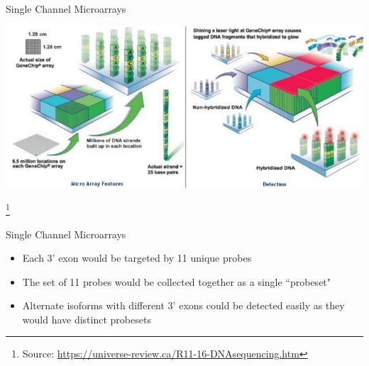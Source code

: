 \documentclass[aspectratio=169,11pt]{beamer}
\newcommand\blfootnote[1]{%
  \begingroup
  \renewcommand\thefootnote{}\footnote{#1}%
  \addtocounter{footnote}{-1}%
  \endgroup
}
\begin{document}
\begin{frame}{Single Channel Microarrays}

	\begin{center}
	\includegraphics[scale=0.4]{figures/microarrayLayout.jpg} 
	\end{center}
	
	\blfootnote{Source: \url{https://universe-review.ca/R11-16-DNAsequencing.htm}}

\end{frame}

\begin{frame}{Single Channel Microarrays}

	\begin{itemize}
		\item Each 3' exon would be targeted by 11 unique probes
		\item The set of 11 probes would be collected together as a single ``probeset"
		\item Alternate isoforms with different 3' exons could be detected easily as they would have distinct probesets
	\end{itemize}

\end{frame}
\end{document}
